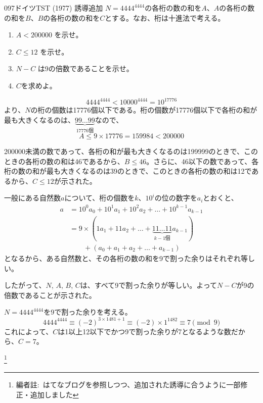 \begin{prob}{097}{}{ドイツTST (1977) 誘導追加}
 $N=4444^{4444}$の各桁の数の和を$A$、$A$の各桁の数の和を$B$、$B$の各桁の数の和を$C$とする。なお、桁は十進法で考える。
 \begin{enumerate}
  \item $A<200000$ を示せ。
  \item $C\le 12$ を示せ。
  \item $N-C$ は9の倍数であることを示せ。
  \item $C$を求めよ。
 \end{enumerate}
\end{prob}

\[ 4444^{4444}<10000^{4444}=10^{17776} \]
より、$N$の桁の個数は17776個以下である。桁の個数が17776個以下で各桁の和が最も大きくなるのは、$\underbrace{99\dots 99}_{17776\text{個}}$なので、
\[ A\le 9\times 17776 = 159984 < 200000 \]

200000未満の数であって、各桁の和が最も大きくなるのは199999のときで、このときの各桁の数の和は46であるから、$B\le 46$。さらに、46以下の数であって、各桁の数の和が最も大きくなるのは39のときで、このときの各桁の数の和は12であるから、$C\le 12$が示された。

一般にある自然数$a$について、桁の個数を$k$、$10^i$の位の数字を$a_i$とおくと、
\begin{align*}
 a&=10^0a_0+10^1a_1+10^2a_2+\dots+10^{k-1}a_{k-1} \\
 &=9\times(1a_1+11a_2+\dots+\underbrace{11\dots 11}_{k-1\text{個}}a_{k-1}) \\
 &\qquad + (a_0+a_1+a_2+\dots+a_{k-1})
\end{align*}
となるから、ある自然数と、その各桁の数の和を9で割った余りはそれぞれ等しい。

したがって、$N$, $A$, $B$, $C$は、すべて9で割った余りが等しい。よって$N-C$が9の倍数であることが示された。

$N=4444^{4444}$を9で割った余りを考える。
\[ 4444^{4444} \equiv (-2)^{3\times 1481+1} \equiv (-2)\times 1^{1482} \equiv 7 \pmod{9} \]
これによって、$C$は1以上12以下でかつ9で割った余りが7となるような数だから、$C=7$。

\footnote{編者註:~はてなブログを参照しつつ、追加された誘導に合うように一部修正・追加しました}
